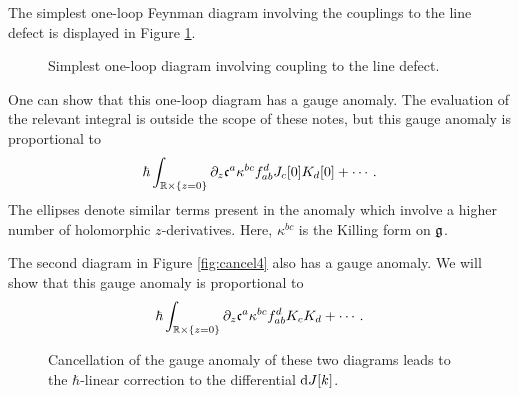\documentclass[11pt]{amsart}
\begin{document}
The simplest one-loop Feynman diagram involving the couplings to the line defect is displayed in Figure \ref{fig:oneloop}. 
\begin{figure}
	\caption{Simplest one-loop diagram involving coupling to the line defect.
	\label{fig:oneloop}}
\end{figure}

One can show that this one-loop diagram has a gauge anomaly.
The evaluation of the relevant integral is outside the scope of these notes, but this gauge anomaly is proportional to
\[
\hbar \int_{\mathbb R \times \{z=0\}} \partial_z \mathfrak c^a \kappa^{bc} f_{ab}^d J_{c} [0] K_{d} [0] + \cdots .
\]
The ellipses denote similar terms present in the anomaly which involve a higher number of holomorphic $z$-derivatives.
Here, $\kappa^{bc}$ is the Killing form on $\mathfrak g$. 



The second diagram in Figure \ref{fig:cancel4} also has a gauge anomaly.
We will show that this gauge anomaly is proportional to 
\[
\hbar \int_{\mathbb R \times \{z=0\}} \partial_z \mathfrak c^a \kappa^{bc} f_{ab}^d K_{c} K_{d} + \cdots .
\]


\begin{figure}
	\caption{Cancellation of the gauge anomaly of these two diagrams leads to the $\hbar$-linear correction to the differential ${\rm d} J[k]$.
	\label{fig:cancel3}}
\end{figure}
\end{document}
